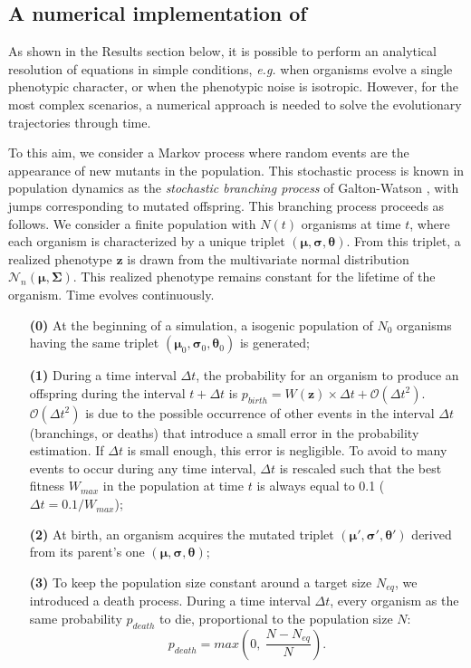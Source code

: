 
\subsection{A numerical implementation of {\sigmaFGM}}

As shown in the Results section below, it is possible to perform an analytical resolution of {\sigmaFGM} equations in simple conditions, \textit{e.g.} when organisms evolve a single phenotypic character, or when the phenotypic noise is isotropic. However, for the most complex scenarios, a numerical approach is needed to solve the evolutionary trajectories through time.

To this aim, we consider a Markov process where random events are the appearance of new mutants in the population. This stochastic process is known in population dynamics as the \textit{stochastic branching process} of Galton-Watson \citep{watson-galton-1875}, with jumps corresponding to mutated offspring. This branching process proceeds as follows. We consider a finite population with $N(t)$ organisms at time $t$, where each organism is characterized by a unique triplet $(\boldsymbol{\mu}, \boldsymbol{\sigma}, \boldsymbol{\theta})$. From this triplet, a realized phenotype $\boldsymbol{z}$ is drawn from the multivariate normal distribution $\mathcal{N}_n(\boldsymbol{\mu}, \boldsymbol{\Sigma})$. This realized phenotype remains constant for the lifetime of the organism. Time evolves continuously.
\begin{enumerate}
\item[\textbf{(0)}] At the beginning of a simulation, a isogenic population of $N_0$ organisms having the same triplet $(\boldsymbol{\mu}_0, \boldsymbol{\sigma}_0, \boldsymbol{\theta}_0)$ is generated;
\item[\textbf{(1)}] During a time interval $\Delta t$, the probability for an organism to produce an offspring during the interval $t+\Delta t$ is $p_{birth} = W(\boldsymbol{z}) \times \Delta t + \mathcal{O}(\Delta t^2)$. $\mathcal{O}(\Delta t^2)$ is due to the possible occurrence of other events in the interval $\Delta t$ (branchings, or deaths) that introduce a small error in the probability estimation. If $\Delta t$ is small enough, this error is negligible. To avoid to many events to occur during any time interval, $\Delta t$ is rescaled such that the best fitness $W_{max}$ in the population at time $t$ is always equal to 0.1 ($\Delta t = 0.1/W_{max}$);
\item[\textbf{(2)}] At birth, an organism acquires the mutated triplet $(\boldsymbol{\mu}', \boldsymbol{\sigma}', \boldsymbol{\theta}')$ derived from its parent's one $(\boldsymbol{\mu}, \boldsymbol{\sigma}, \boldsymbol{\theta})$;
\item[\textbf{(3)}] To keep the population size constant around a target size $N_{eq}$, we introduced a death process.
During a time interval $\Delta t$, every organism as the same probability $p_{death}$ to die, proportional to the population size $N$:
\begin{equation}
p_{death} = max \left( 0,\ \dfrac{N-N_{eq}}{N} \right).
\end{equation}
\end{enumerate}
